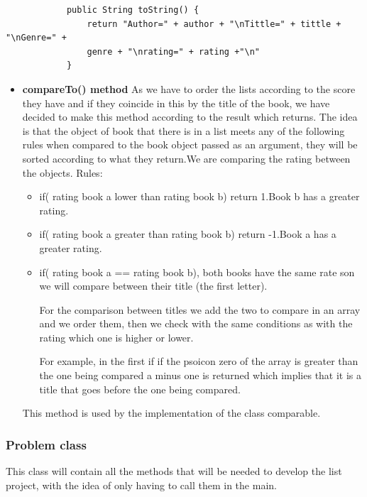 \documentclass[a4paper]{article}
\theoremstyle{plain}
\theoremstyle{definition}
\begin{document}
            \begin{verbatim}
            public String toString() {
                return "Author=" + author + "\nTittle=" + tittle + "\nGenre=" + 
                genre + "\nrating=" + rating +"\n"
            }
             \end{verbatim}
        \begin{itemize}    
            \item\textbf{compareTo() method}\newline
                As we have to order the lists according to the score they have and if they coincide in this by the title of the book, we have decided to make this method according to the result which returns. The idea is that the object of book that there is in a list meets any of the following rules when compared to the book object passed as an argument, they will be sorted according to what they return.We are comparing the rating between the objects. Rules: \newline
                
                \begin{itemize}
                    \item if( rating book a lower than rating book b) return 1.Book b has a greater rating.
                    \item if( rating book a greater than rating book b) return -1.Book a has a greater rating.
                    \item if( rating book a == rating book b), both books have the same rate son we will compare between their title (the first letter). \par
                    
                    For the comparison between titles we add the two to compare in an array and we order them, then we check with the same conditions as with the rating which one is higher or lower. \par  
                    
                    For example, in the first if if the psoicon zero of the array is greater than the one being compared a minus one is returned which implies that it is a title that goes before the one being compared.
                \end{itemize}
                This method is used by the implementation of the class comparable.
          \end{itemize}


	    \subsubsection{Problem class}
	    This class will contain all the methods that will be needed to develop the list project, with the idea of only having to call them in the main.
	    
\end{document}
